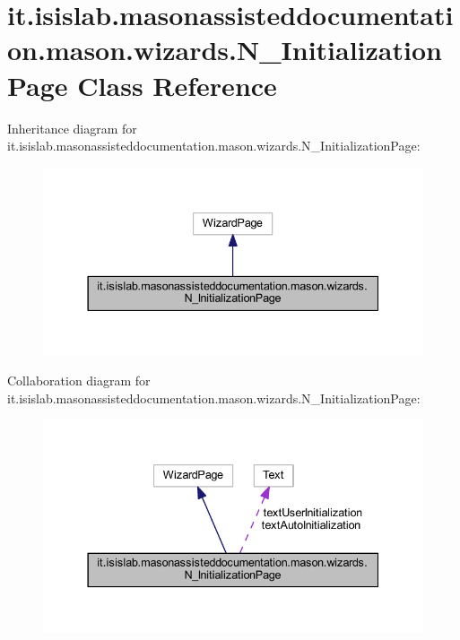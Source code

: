 \hypertarget{classit_1_1isislab_1_1masonassisteddocumentation_1_1mason_1_1wizards_1_1_n___initialization_page}{\section{it.\-isislab.\-masonassisteddocumentation.\-mason.\-wizards.\-N\-\_\-\-Initialization\-Page Class Reference}
\label{classit_1_1isislab_1_1masonassisteddocumentation_1_1mason_1_1wizards_1_1_n___initialization_page}
}


Inheritance diagram for it.\-isislab.\-masonassisteddocumentation.\-mason.\-wizards.\-N\-\_\-\-Initialization\-Page\-:
\nopagebreak
\begin{figure}[H]
\begin{center}
\leavevmode
\includegraphics[width=337pt]{classit_1_1isislab_1_1masonassisteddocumentation_1_1mason_1_1wizards_1_1_n___initialization_page__inherit__graph}
\end{center}
\end{figure}


Collaboration diagram for it.\-isislab.\-masonassisteddocumentation.\-mason.\-wizards.\-N\-\_\-\-Initialization\-Page\-:
\nopagebreak
\begin{figure}[H]
\begin{center}
\leavevmode
\includegraphics[width=337pt]{classit_1_1isislab_1_1masonassisteddocumentation_1_1mason_1_1wizards_1_1_n___initialization_page__coll__graph}
\end{center}
\end{figure}
